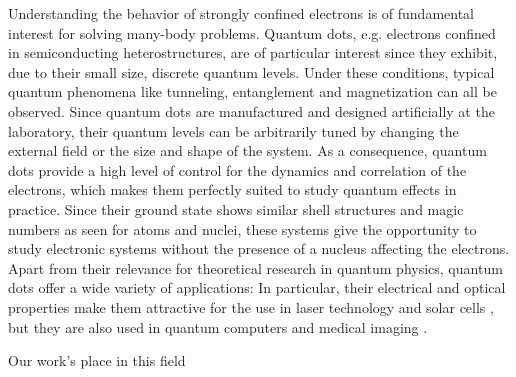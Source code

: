 \documentclass[twocolumn,superscriptaddress,unsortedaddress,
 amsmath,amssymb,
 aps,
]{revtex4-2}
\begin{document}
Understanding the behavior of strongly confined electrons is of fundamental
interest for solving many-body problems.  Quantum dots, e.g. electrons
confined in semiconducting heterostructures, are of particular interest since
they exhibit, due to their small size, discrete quantum levels.  Under these
conditions, typical quantum phenomena like tunneling, entanglement and
magnetization can all be observed.   Since quantum
dots are manufactured and designed artificially at the laboratory, their
quantum levels can be arbitrarily tuned by changing the external field or the
size and shape of the system.  As a consequence, quantum dots provide a high
level of control for the dynamics and correlation of the electrons, which
makes them perfectly suited to study quantum effects in practice.  Since their
ground state shows similar shell structures and magic numbers as seen for
atoms and nuclei, these systems give the opportunity to
study electronic systems without the presence of a nucleus affecting the
electrons.  Apart from their relevance for theoretical research in quantum
physics, quantum dots offer a wide variety of applications: In particular,
their electrical and optical properties make them attractive for the use in
laser technology \cite{strauf2010,5075760} and solar cells
\cite{jenks:013111,doi:10.1021/cr900289f}, but they are also used in quantum
computers\cite{PhysRevA.57.120} and medical imaging \cite{Ben-Ari02042003}.


Our work's place in this field

\end{document}
